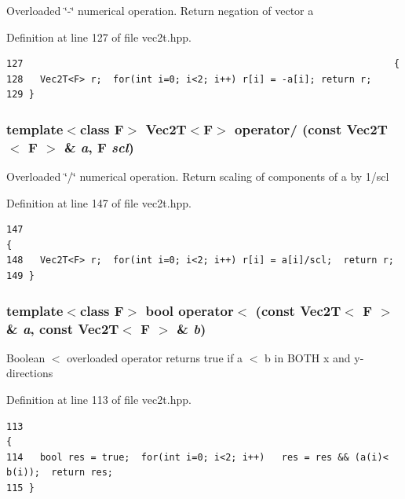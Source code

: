 Overloaded \char`\"{}-\char`\"{} numerical operation. Return negation of vector a 

Definition at line 127 of file vec2t.hpp.

\footnotesize\begin{verbatim}127                                                                  {
128   Vec2T<F> r;  for(int i=0; i<2; i++) r[i] = -a[i]; return r;
129 }
\end{verbatim}\normalsize 


\subsubsection{\setlength{\rightskip}{0pt plus 5cm}template$<$class F$>$ {\bf Vec2T}$<$F$>$ operator/ (const {\bf Vec2T}$<$ F $>$ \& {\em a}, F {\em scl})\hspace{0.3cm}{\tt  [inline]}}\label{vec2t_8hpp_7fe76b7380c30957ec81265fac42ea2f_7fe76b7380c30957ec81265fac42ea2f}


Overloaded \char`\"{}/\char`\"{} numerical operation. Return scaling of components of a by 1/scl 

Definition at line 147 of file vec2t.hpp.

\footnotesize\begin{verbatim}147                                                                         {
148   Vec2T<F> r;  for(int i=0; i<2; i++) r[i] = a[i]/scl;  return r;
149 }
\end{verbatim}\normalsize 


\subsubsection{\setlength{\rightskip}{0pt plus 5cm}template$<$class F$>$ bool operator$<$ (const {\bf Vec2T}$<$ F $>$ \& {\em a}, const {\bf Vec2T}$<$ F $>$ \& {\em b})\hspace{0.3cm}{\tt  [inline]}}\label{vec2t_8hpp_a8e36c9dee662bb9b78f51ad9eaf68d8_a8e36c9dee662bb9b78f51ad9eaf68d8}


Boolean $<$ overloaded operator returns true if a $<$ b in BOTH x and y-directions 

Definition at line 113 of file vec2t.hpp.

\footnotesize\begin{verbatim}113                                                                                 {
114   bool res = true;  for(int i=0; i<2; i++)   res = res && (a(i)< b(i));  return res; 
115 }
\end{verbatim}\normalsize 


